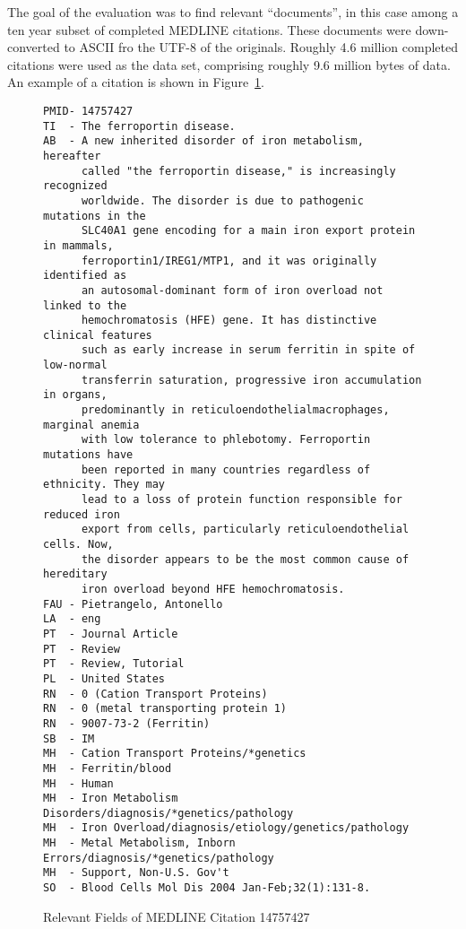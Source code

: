 \documentclass[11pt,oneside]{article}
\begin{document}
The goal of the evaluation was to find relevant ``documents'', in this
case among a ten year subset of completed MEDLINE citations.  These
documents were down-converted to ASCII fro the UTF-8 of the originals.
Roughly 4.6 million completed citations were used as the data set,
comprising roughly 9.6 million bytes of data.  An example of a
citation is shown in Figure~\ref{medline-citation-fig}.
%
\begin{figure}
{
\small
\begin{verbatim}
PMID- 14757427
TI  - The ferroportin disease.
AB  - A new inherited disorder of iron metabolism, hereafter 
      called "the ferroportin disease," is increasingly recognized 
      worldwide. The disorder is due to pathogenic mutations in the 
      SLC40A1 gene encoding for a main iron export protein in mammals, 
      ferroportin1/IREG1/MTP1, and it was originally identified as 
      an autosomal-dominant form of iron overload not linked to the 
      hemochromatosis (HFE) gene. It has distinctive clinical features 
      such as early increase in serum ferritin in spite of low-normal 
      transferrin saturation, progressive iron accumulation in organs, 
      predominantly in reticuloendothelialmacrophages, marginal anemia 
      with low tolerance to phlebotomy. Ferroportin mutations have 
      been reported in many countries regardless of ethnicity. They may 
      lead to a loss of protein function responsible for reduced iron 
      export from cells, particularly reticuloendothelial cells. Now, 
      the disorder appears to be the most common cause of hereditary
      iron overload beyond HFE hemochromatosis.
FAU - Pietrangelo, Antonello
LA  - eng
PT  - Journal Article
PT  - Review
PT  - Review, Tutorial
PL  - United States
RN  - 0 (Cation Transport Proteins)
RN  - 0 (metal transporting protein 1)
RN  - 9007-73-2 (Ferritin)
SB  - IM
MH  - Cation Transport Proteins/*genetics
MH  - Ferritin/blood
MH  - Human
MH  - Iron Metabolism Disorders/diagnosis/*genetics/pathology
MH  - Iron Overload/diagnosis/etiology/genetics/pathology
MH  - Metal Metabolism, Inborn Errors/diagnosis/*genetics/pathology
MH  - Support, Non-U.S. Gov't
SO  - Blood Cells Mol Dis 2004 Jan-Feb;32(1):131-8.
\end{verbatim}
}
\caption{Relevant Fields of MEDLINE Citation 14757427}
\label{medline-citation-fig}
\end{figure}
\end{document}
